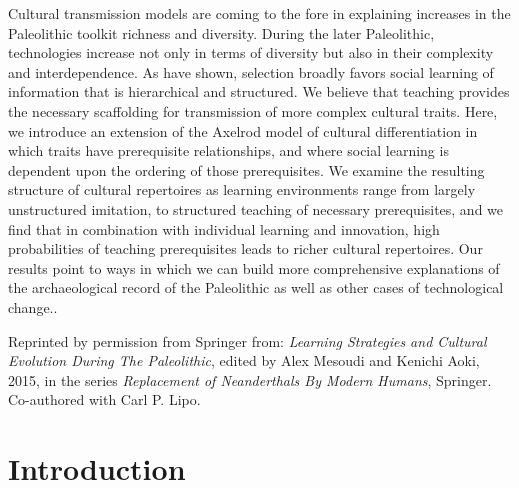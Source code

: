 
\begin{description}[leftmargin=-1\labelwidth]
\item[\textsc{Abstract}] Cultural transmission models are coming to the fore in explaining increases in the Paleolithic toolkit richness and diversity. During the later Paleolithic, technologies increase not only in terms of diversity but also in their complexity and interdependence. As \citet{mesoudi2008learning} have shown, selection broadly favors social learning of information that is hierarchical and structured.  We believe that teaching provides the necessary scaffolding for transmission of more complex cultural traits.  Here, we introduce an extension of the Axelrod \citeyearpar{axelrod1997} model of cultural differentiation in which traits have prerequisite relationships, and where social learning is dependent upon the ordering of those prerequisites. We examine the resulting structure of cultural repertoires as learning environments range from largely unstructured imitation, to structured teaching of necessary prerequisites, and we find that in combination with individual learning and innovation, high probabilities of teaching prerequisites leads to richer cultural repertoires.  Our results point to ways in which we can build more comprehensive explanations of the archaeological record of the Paleolithic as well as other cases of technological change..

\item[\textsc{Source}]  Reprinted by permission from Springer from: \textit{Learning Strategies and Cultural Evolution During The Paleolithic}, edited by Alex Mesoudi and Kenichi Aoki, 2015, in the series \textit{Replacement of Neanderthals By Modern Humans}, Springer.  Co-authored with Carl P. Lipo.
\end{description}





\section{Introduction}\label{semax:sec:introduction}

